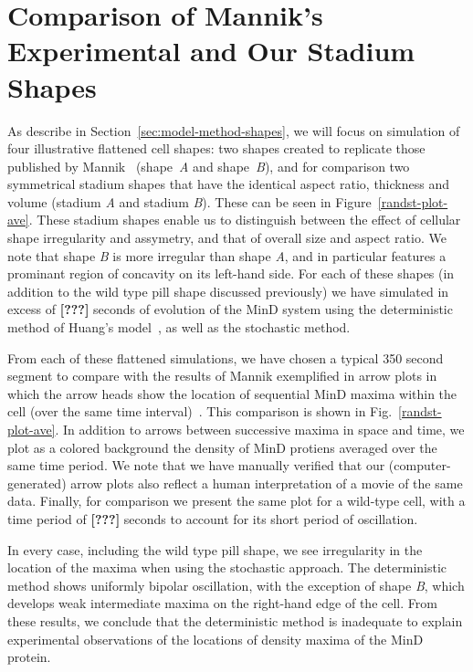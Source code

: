 \documentclass[letterpaper,twocolumn,amsmath,amssymb,pre]{revtex4-1}
\newcommand{\red}[1]{{\bf \color{red} #1}}
\newcommand{\fixme}[1]{\red{[#1]}}
\begin{document}
\section{Comparison of Mannik's Experimental and Our Stadium Shapes}

As describe in Section~\ref{sec:model-method-shapes}, we will focus on
simulation of four illustrative flattened cell shapes: two shapes
created to replicate those published by
Mannik~\cite{mannik2012robustness} (shape~\emph{A} and
shape~\emph{B}), and for comparison two symmetrical stadium shapes
that have the identical aspect ratio, thickness and volume (stadium
\emph{A} and stadium \emph{B}).  These can be seen in
Figure~\ref{randst-plot-ave}.  These stadium shapes enable us to
distinguish between the effect of cellular shape irregularity and
assymetry, and that of overall size and aspect ratio.  We note that
shape \emph{B} is more irregular than shape \emph{A}, and in
particular features a prominant region of concavity on its left-hand
side.  For each of these shapes (in addition to the wild type pill
shape discussed previously) we have simulated in excess of \fixme{???}
seconds of evolution of the MinD system using the deterministic method
of Huang's model~\cite{huang2003dynamic}, as well as the stochastic
method.

From each of these flattened simulations, we have chosen a typical 350
second segment to compare with the results of Mannik exemplified in
arrow plots in which the arrow heads show the location of sequential
MinD maxima within the cell (over the same time
interval)~\cite{mannik2012robustness}.  This comparison is shown in
Fig.~\ref{randst-plot-ave}.  In addition to arrows between successive
maxima in space and time, we plot as a colored background the density
of MinD protiens averaged over the same time period.  We note that we
have manually verified that our (computer-generated) arrow plots also
reflect a human interpretation of a movie of the same data.  Finally,
for comparison we present the same plot for a wild-type cell, with a
time period of \fixme{???}  seconds to account for its short period of
oscillation.

In every case, including the wild type pill shape, we see irregularity
in the location of the maxima when using the stochastic approach.  The
deterministic method shows uniformly bipolar oscillation, with the
exception of shape \emph{B}, which develops weak intermediate maxima
on the right-hand edge of the cell.  From these results, we conclude
that the deterministic method is inadequate to explain experimental
observations of the locations of density maxima of the MinD protein.
\end{document}
